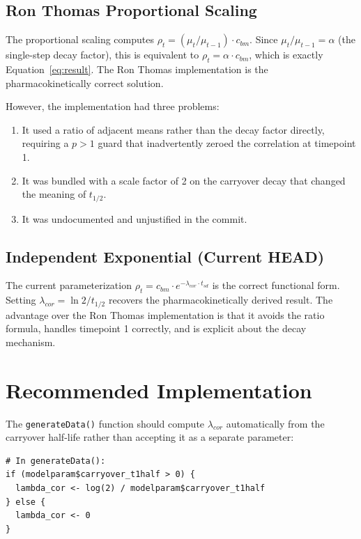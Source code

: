 \documentclass[11pt]{article}
\begin{document}
\subsection{Ron Thomas Proportional Scaling}

The proportional scaling computes $\rho_t = (\mu_t /
\mu_{t-1}) \cdot c_{bm}$. Since $\mu_t / \mu_{t-1} =
\alpha$ (the single-step decay factor), this is equivalent
to $\rho_t = \alpha \cdot c_{bm}$, which is exactly
Equation~\ref{eq:result}. The Ron Thomas implementation
is the pharmacokinetically correct solution.

However, the implementation had three problems:

\begin{enumerate}
\item It used a ratio of adjacent means rather than the
  decay factor directly, requiring a $p > 1$ guard that
  inadvertently zeroed the correlation at timepoint 1.
\item It was bundled with a scale factor of 2 on the
  carryover decay that changed the meaning of
  $t_{1/2}$.
\item It was undocumented and unjustified in the commit.
\end{enumerate}

\subsection{Independent Exponential (Current HEAD)}

The current parameterization $\rho_t = c_{bm} \cdot
e^{-\lambda_{cor} \cdot t_{sd}}$ is the correct functional
form. Setting $\lambda_{cor} = \ln 2 / t_{1/2}$ recovers
the pharmacokinetically derived result. The advantage over
the Ron Thomas implementation is that it avoids the ratio
formula, handles timepoint 1 correctly, and is explicit
about the decay mechanism.

\section{Recommended Implementation}

The \texttt{generateData()} function should compute
$\lambda_{cor}$ automatically from the carryover half-life
rather than accepting it as a separate parameter:

\begin{verbatim}
# In generateData():
if (modelparam$carryover_t1half > 0) {
  lambda_cor <- log(2) / modelparam$carryover_t1half
} else {
  lambda_cor <- 0
}
\end{verbatim}
\end{document}
